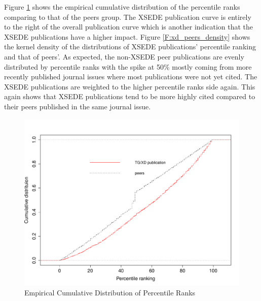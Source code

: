 \documentclass{sig-alternate}
\begin{document}
Figure \ref{F:ptranking_cdf} shows the empirical cumulative
distribution of the percentile ranks comparing to that of the peers
group. The XSEDE publication curve is entirely to the right of the
overall publication curve which is another indication that the XSEDE
publications have a higher impact.  Figure \ref{F:xd_peers_density}
shows the kernel density of the distributions of XSEDE publications'
percentile ranking and that of peers'. As expected, the non-XSEDE peer
publications are evenly distributed by percentile ranks with the spike
at 50\% mostly coming from more recently published journal issues
where most publications were not yet cited. The XSEDE publications are
weighted to the higher percentile ranks side again. This again shows
that XSEDE publications tend to be more highly cited compared to their
peers published in the same journal issue.

\begin{figure}[htb!]
    \includegraphics[width=0.95\columnwidth]{images/ptranking_CDF.pdf}
    \caption{Empirical Cumulative Distribution of Percentile Ranks}
    \label{F:ptranking_cdf}
\end{figure}
\end{document}
